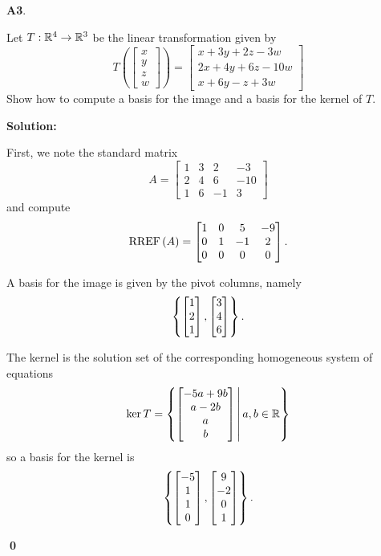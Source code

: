 \documentclass{article}
\newenvironment{problem}[1]
{
  \begin{flushleft}
  \textbf{#1}.
  \ignorespaces
}
{
  \end{flushleft}
}
\newenvironment{solution}
{
  \ignorespaces
  \textbf{Solution:}
}
{
  \ignorespacesafterend
  \begin{flushright}
  {\bfseries \qed}
  \end{flushright}
}
\begin{document}
\begin{problem}{A3}
Let \(T: \mathbb{R}^4 \rightarrow \mathbb{R}^3\) be the linear transformation given by
\[
  T\left(\begin{bmatrix}x\\y\\z\\w\end{bmatrix} \right) =
  \begin{bmatrix}
    x+3y+2z-3w \\
    2x+4y+6z-10w \\
    x+6y-z+3w
  \end{bmatrix}
\]
Show how to compute a basis for the image and a basis for the kernel of \(T\).
\end{problem}
\begin{solution}
First, we note the standard matrix
\[A=\begin{bmatrix}1 & 3 & 2 & -3 \\ 2 & 4 & 6 & -10 \\ 1 & 6 & -1 & 3 \end{bmatrix}\]
and compute
\[\operatorname{RREF}\left(A\right) = \begin{bmatrix} 1 & 0 & 5 & -9 \\ 0 & 1 & -1 & 2 \\ 0 & 0 & 0 & 0\end{bmatrix}.\]

A basis for the image is given by the pivot columns, namely
\[\left\{\begin{bmatrix}1\\2\\1 \end{bmatrix},
\begin{bmatrix}3\\4\\6 \end{bmatrix}\right\}.\]

The kernel is the solution set of the corresponding homogeneous system of equations
\[ \ker T = \left\{\begin{bmatrix}-5a+9b \\ a-2b \\ a \\ b \end{bmatrix}\,\middle|\,a,b \in \mathbb{R}\right\} \]
so a basis for the kernel is
\[\left\{\begin{bmatrix}-5 \\ 1 \\ 1 \\ 0 \end{bmatrix},
\begin{bmatrix}9 \\ -2 \\ 0 \\ 1 \end{bmatrix}\right\}.\]
\end{solution}
\end{document}
